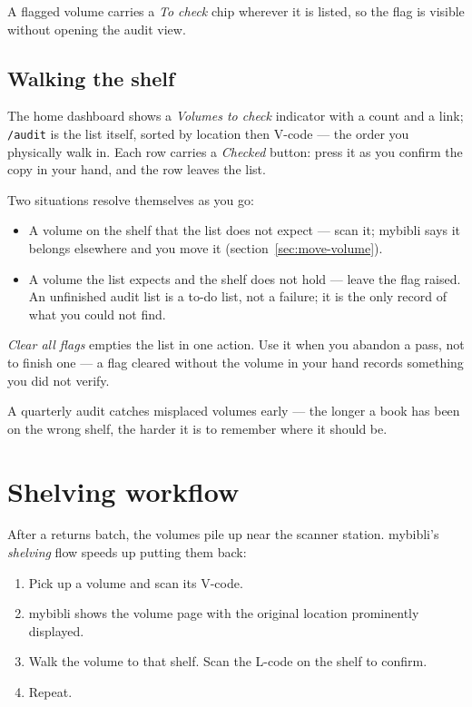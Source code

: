 A flagged volume carries a \emph{To check} chip wherever it is listed,
so the flag is visible without opening the audit view.

\subsection*{Walking the shelf}

The home dashboard shows a \emph{Volumes to check} indicator with a
count and a link; \texttt{/audit} is the list itself, sorted by
location then V-code — the order you physically walk in. Each row
carries a \emph{Checked} button: press it as you confirm the copy in
your hand, and the row leaves the list.

Two situations resolve themselves as you go:

\begin{itemize}
  \item A volume on the shelf that the list does not expect — scan it;
        mybibli says it belongs elsewhere and you move it
        (section~\ref{sec:move-volume}).
  \item A volume the list expects and the shelf does not hold — leave
        the flag raised. An unfinished audit list is a to-do list, not
        a failure; it is the only record of what you could not find.
\end{itemize}

\emph{Clear all flags} empties the list in one action. Use it when you
abandon a pass, not to finish one — a flag cleared without the volume
in your hand records something you did not verify.

\begin{tip}
A quarterly audit catches misplaced volumes early — the longer a
book has been on the wrong shelf, the harder it is to remember
where it should be.
\end{tip}

\section{Shelving workflow}\label{sec:shelving}

After a returns batch, the volumes pile up near the scanner
station. mybibli's \emph{shelving} flow speeds up
putting them back:

\begin{enumerate}
  \item Pick up a volume and scan its V-code.
  \item mybibli shows the volume page with the original location
        prominently displayed.
  \item Walk the volume to that shelf. Scan the L-code on the shelf
        to confirm.
  \item Repeat.
\end{enumerate}

